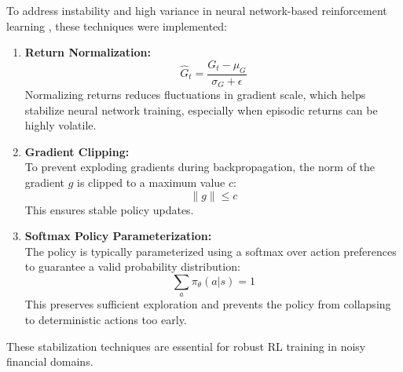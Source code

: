 To address instability and high variance in neural network-based reinforcement learning \citep{wikipediapolicysradient}, these techniques were implemented:

\begin{enumerate}
    \item \textbf{Return Normalization:}
    \[
    \hat{G}_t = \frac{G_t - \mu_G}{\sigma_G + \epsilon}
    \]
    Normalizing returns reduces fluctuations in gradient scale, which helps stabilize neural network training, especially when episodic returns can be highly volatile.

    \item \textbf{Gradient Clipping:} \\
    To prevent exploding gradients during backpropagation, the norm of the gradient $g$ is clipped to a maximum value $c$:
    \[
    \|g\| \leq c
    \]
    This ensures stable policy updates.

    \item \textbf{Softmax Policy Parameterization:} \\
    The policy is typically parameterized using a softmax over action preferences to guarantee a valid probability distribution:
    \[
    \sum_a \pi_\theta(a|s) = 1
    \]
    This preserves sufficient exploration and prevents the policy from collapsing to deterministic actions too early.
\end{enumerate}

These stabilization techniques are essential for robust RL training in noisy financial domains.
